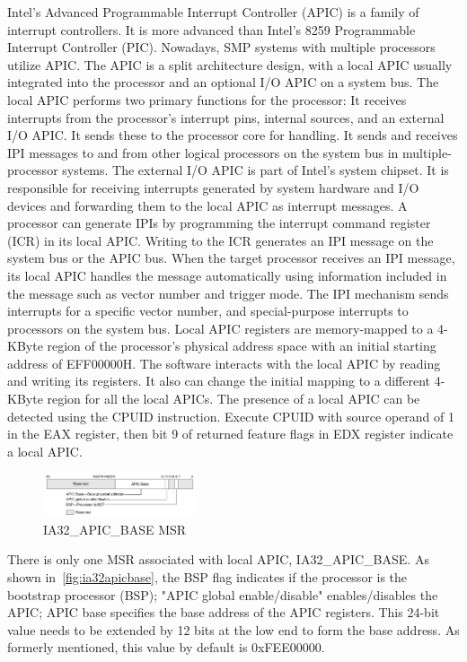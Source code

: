 Intel's Advanced Programmable Interrupt Controller (APIC) is a family of interrupt controllers. It is more advanced than Intel's 8259 Programmable Interrupt Controller (PIC). Nowadays, SMP systems with multiple processors utilize APIC. The APIC is a split architecture design, with a local APIC usually integrated into the processor and an optional I/O APIC on a system bus. The local APIC performs two primary functions for the processor:
It receives interrupts from the processor's interrupt pins, internal sources, and an external I/O APIC. It sends these to the processor core for handling.
It sends and receives IPI messages to and from other logical processors on the system bus in multiple-processor systems.
The external I/O APIC is part of Intel's system chipset. It is responsible for receiving interrupts generated by system hardware and I/O devices and forwarding them to the local APIC as interrupt messages. A processor can generate IPIs by programming the interrupt command register (ICR) in its local APIC. Writing to the ICR generates an IPI message on the system bus or the APIC bus. When the target processor receives an IPI message, its local APIC handles the message automatically using information included in the message such as vector number and trigger mode. The IPI mechanism sends interrupts for a specific vector number, and special-purpose interrupts to processors on the system bus. Local APIC registers are memory-mapped to a 4-KByte region of the processor's physical address space with an initial starting address of EFF00000H. The software interacts with the local APIC by reading and writing its registers. It also can change the initial mapping to a different 4-KByte region for all the local APICs. The presence of a local APIC can be detected using the CPUID instruction. Execute CPUID with source operand of 1 in the EAX register, then bit 9 of returned feature flags in EDX register indicate a local APIC.


\begin{figure}[th]
  \includegraphics[width=0.40\textwidth]{figures/ia32apicbase}
  \centering
  \caption{IA32\_APIC\_BASE MSR}
  \label{fig:ia32apicbase}
\end{figure}

There is only one MSR associated with local APIC, IA32\_APIC\_BASE. As shown in~\autoref{fig:ia32apicbase}, the BSP flag indicates if the processor is the bootstrap processor (BSP); "APIC global enable/disable" enables/disables the APIC; APIC base specifies the base address of the APIC registers. This 24-bit value needs to be extended by 12 bits at the low end to form the base address. As formerly mentioned, this value by default is 0xFEE00000.

